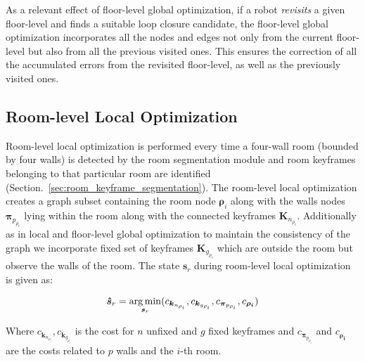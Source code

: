As a relevant effect of floor-level global optimization, if a robot \textit{revisits} a given floor-level and finds a suitable loop closure candidate, the floor-level global optimization incorporates all the nodes and edges not only from the current floor-level but also from all the previous visited ones. This ensures the correction of all the accumulated errors from the revisited floor-level, as well as the previously visited ones.   

\subsection{Room-level Local Optimization}

Room-level local optimization is performed every time a four-wall room (bounded by four walls) is detected by the room segmentation module and room keyframes belonging to that particular room are identified (Section.~\ref{sec:room_keyframe_segmentation}). The room-level local optimization creates a graph subset containing the room node $\boldsymbol{\rho}_i$ along with the walls nodes $\boldsymbol{\pi}_{p_{\rho_i}}$ lying within the room along with the connected keyframes $\boldsymbol{K}_{n_{\rho_i}}$. Additionally as in local and floor-level global optimization to maintain the consistency of the graph we incorporate fixed set of keyframes $\boldsymbol{K}_{g_{\rho_i}}$ which are outside the room but observe the walls of the room. The state $\boldsymbol{s}_r$ during room-level local optimization is given as:

\begin{equation}
    \boldsymbol{\hat{s}}_r = \operatorname*{arg\,min}_{\boldsymbol{s}_r} (c_{\boldsymbol{k}_{n_{\rho_i}}}, c_{\boldsymbol{k}_{g_{\rho_i}}}, c_{\boldsymbol{\pi}_{p_{\rho_i}}}, c_{\boldsymbol{\rho_i}})
\end{equation}

Where $c_{\boldsymbol{k}_{n_{\rho_i}}}, c_{\boldsymbol{k}_{g_{\rho_i}}}$ is the cost for $n$ unfixed and $g$ fixed keyframes and $c_{\boldsymbol{\pi}_{p_{\rho_i}}}$ and $c_{\boldsymbol{\rho_i}}$ are the costs related to $p$ walls and the $i$-th room. 

